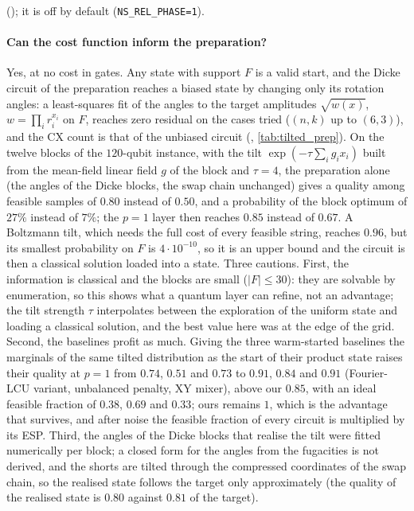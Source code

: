 (); it is off by default (\texttt{NS\_REL\_PHASE=1}).



\paragraph{Can the cost function inform the preparation?}  Yes, at no cost in gates. Any state with support $F$ is a valid start, and the Dicke circuit of the preparation reaches a biased state by changing only its rotation angles: a least-squares fit of the angles to the target amplitudes $\sqrt{w(x)}$, $w=\prod_i r_i^{x_i}$ on $F$, reaches zero residual on the cases tried ($(n,k)$ up to $(6,3)$), and the CX count is that of the unbiased circuit (, \cref{tab:tilted_prep}). On the twelve blocks of the $120$-qubit instance, with the tilt $\exp(-\tau\sum_ig_ix_i)$ built from the mean-field linear field $g$ of the block and $\tau=4$, the preparation alone (the angles of the Dicke blocks, the swap chain unchanged) gives a quality among feasible samples of $0.80$ instead of $0.50$, and a probability of the block optimum of $27\%$ instead of $7\%$; the $p=1$ layer then reaches $0.85$ instead of $0.67$. A Boltzmann tilt, which needs the full cost of every feasible string, reaches $0.96$, but its smallest probability on $F$ is $4\cdot10^{-10}$, so it is an upper bound and the circuit is then a classical solution loaded into a state. Three cautions. First, the information is classical and the blocks are small ($|F|\le30$): they are solvable by enumeration, so this shows what a quantum layer can refine, not an advantage; the tilt strength $\tau$ interpolates between the exploration of the uniform state and loading a classical solution, and the best value here was at the edge of the grid. Second, the baselines profit as much. Giving the three warm-started baselines the marginals of the same tilted distribution as the start of their product state raises their quality at $p=1$ from $0.74$, $0.51$ and $0.73$ to $0.91$, $0.84$ and $0.91$ (Fourier-LCU variant, unbalanced penalty, XY mixer), above our $0.85$, with an ideal feasible fraction of $0.38$, $0.69$ and $0.33$; ours remains $1$, which is the advantage that survives, and after noise the feasible fraction of every circuit is multiplied by its ESP. Third, the angles of the Dicke blocks that realise the tilt were fitted numerically per block; a closed form for the angles from the fugacities is not derived, and the shorts are tilted through the compressed coordinates of the swap chain, so the realised state follows the target only approximately (the quality of the realised state is $0.80$ against $0.81$ of the target).


